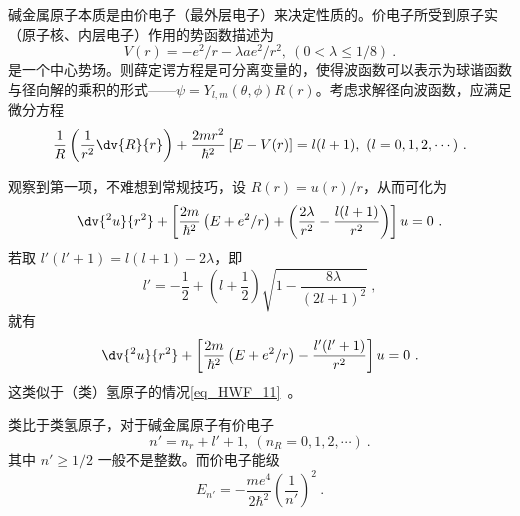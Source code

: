 

碱金属原子本质是由价电子（最外层电子）来决定性质的。价电子所受到原子实（原子核、内层电子）作用的势函数描述为
\begin{equation}
V(r) = -e^2/r - \lambda a e^2/r^2, \ (0 < \lambda \le 1/8) ~.
\end{equation}
是一个中心势场。则薛定谔方程是可分离变量的，使得波函数可以表示为球谐函数与径向解的乘积的形式——$\psi = Y_{l, m}(\theta, \phi) R(r)$。考虑求解径向波函数，应满足微分方程
\begin{equation}
\frac{1}{R} \left(\frac{1}{r^2} \dv{R}{r}\right) + \frac{2mr^2}{\hbar^2} \left[E - V(r)\right] = l(l+1), \ (l = 0, 1, 2, \cdots)~.
\end{equation}

观察到第一项，不难想到常规技巧，设 $R(r) = u(r) /r$，从而可化为
\begin{equation}
\dv{^2 u}{r^2} + \left[\frac{2m}{\hbar^2}\left(E + e^2/r\right) + \left(\frac{2 \lambda}{r^2} - \frac{l(l+1)}{r^2}\right)\right]u = 0 ~.
\end{equation}
若取 $l'(l'+1) = l(l+1) - 2\lambda$，即
$$l' = -\frac12 + \left(l + \frac12\right) \sqrt{1 - \frac{8\lambda}{(2l+1)^2}} ~,$$
就有
\begin{equation}
\dv{^2 u}{r^2} + \left[\frac{2m}{\hbar^2}\left(E + e^2/r\right) - \frac{l'(l'+1)}{r^2}\right]u = 0 ~.
\end{equation}
这类似于（类）氢原子的情况\autoref{eq_HWF_11}~。

类比于类氢原子，对于碱金属原子有价电子
$$n' = n_r + l' + 1, \ (n_R = 0, 1, 2, \cdots) ~.$$
其中 $n' \ge 1/2$ 一般不是整数。而价电子能级
\begin{equation}
E_{n'} = -\frac{me^4}{2\hbar^2} \left(\frac{1}{n'}\right)^2 ~.
\end{equation}
